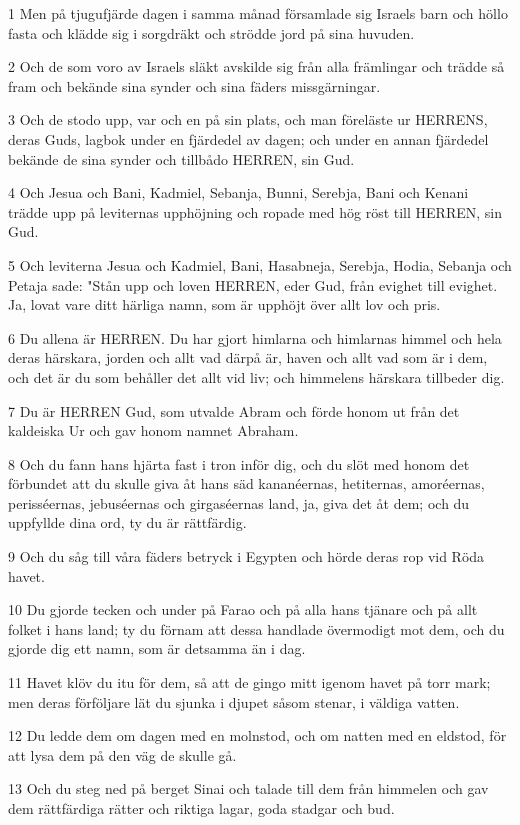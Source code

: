\par 1 Men på tjugufjärde dagen i samma månad församlade sig Israels barn och höllo fasta och klädde sig i sorgdräkt och strödde jord på sina huvuden.
\par 2 Och de som voro av Israels släkt avskilde sig från alla främlingar och trädde så fram och bekände sina synder och sina fäders missgärningar.
\par 3 Och de stodo upp, var och en på sin plats, och man föreläste ur HERRENS, deras Guds, lagbok under en fjärdedel av dagen; och under en annan fjärdedel bekände de sina synder och tillbådo HERREN, sin Gud.
\par 4 Och Jesua och Bani, Kadmiel, Sebanja, Bunni, Serebja, Bani och Kenani trädde upp på leviternas upphöjning och ropade med hög röst till HERREN, sin Gud.
\par 5 Och leviterna Jesua och Kadmiel, Bani, Hasabneja, Serebja, Hodia, Sebanja och Petaja sade: "Stån upp och loven HERREN, eder Gud, från evighet till evighet. Ja, lovat vare ditt härliga namn, som är upphöjt över allt lov och pris.
\par 6 Du allena är HERREN. Du har gjort himlarna och himlarnas himmel och hela deras härskara, jorden och allt vad därpå är, haven och allt vad som är i dem, och det är du som behåller det allt vid liv; och himmelens härskara tillbeder dig.
\par 7 Du är HERREN Gud, som utvalde Abram och förde honom ut från det kaldeiska Ur och gav honom namnet Abraham.
\par 8 Och du fann hans hjärta fast i tron inför dig, och du slöt med honom det förbundet att du skulle giva åt hans säd kananéernas, hetiternas, amoréernas, perisséernas, jebuséernas och girgaséernas land, ja, giva det åt dem; och du uppfyllde dina ord, ty du är rättfärdig.
\par 9 Och du såg till våra fäders betryck i Egypten och hörde deras rop vid Röda havet.
\par 10 Du gjorde tecken och under på Farao och på alla hans tjänare och på allt folket i hans land; ty du förnam att dessa handlade övermodigt mot dem, och du gjorde dig ett namn, som är detsamma än i dag.
\par 11 Havet klöv du itu för dem, så att de gingo mitt igenom havet på torr mark; men deras förföljare lät du sjunka i djupet såsom stenar, i väldiga vatten.
\par 12 Du ledde dem om dagen med en molnstod, och om natten med en eldstod, för att lysa dem på den väg de skulle gå.
\par 13 Och du steg ned på berget Sinai och talade till dem från himmelen och gav dem rättfärdiga rätter och riktiga lagar, goda stadgar och bud.
